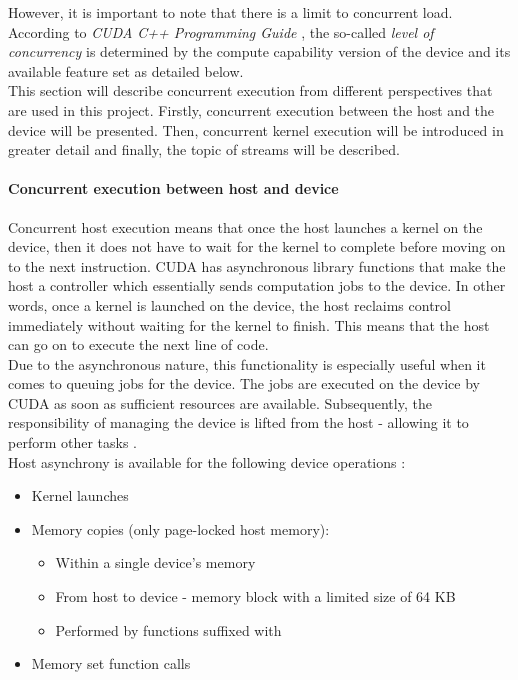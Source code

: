 However, it is important to note that there is a limit to concurrent load. According to \emph{CUDA C++ Programming Guide} \cite{NVIDIAMay2022}, the so-called \textit{level of concurrency} is determined by the compute capability version of the device and its available feature set as detailed below. \\
This section will describe concurrent execution from different perspectives that are used in this project. Firstly, concurrent execution between the host and the device will be presented. Then, concurrent kernel execution will be introduced in greater detail and finally, the topic of streams will be described.
 
\paragraph{Concurrent execution between host and device}
Concurrent host execution means that once the host launches a kernel on the device, then it does not have to wait for the kernel to complete before moving on to the next instruction. CUDA has asynchronous library functions that make the host a controller which essentially sends computation jobs to the device. In other words, once a kernel is launched on the device, the host reclaims control immediately without waiting for the kernel to finish. This means that the host can go on to execute the next line of code. \\
Due to the asynchronous nature, this functionality is especially useful when it comes to queuing jobs for the device. The jobs are executed on the device by CUDA as soon as sufficient resources are available. Subsequently, the responsibility of managing the device is lifted from the host - allowing it to perform other tasks \cite{NVIDIAMay2022}. \\
Host asynchrony is available for the following device operations \cite{NVIDIAMay2022}:

\begin{itemize}
	\item Kernel launches
	\item Memory copies (only page-locked host memory):
	\begin{itemize}
		\item Within a single device's memory
		\item From host to device - memory block with a limited size of 64 KB
		\item Performed by functions suffixed with 
	\end{itemize}
	\item Memory set function calls
\end{itemize}

